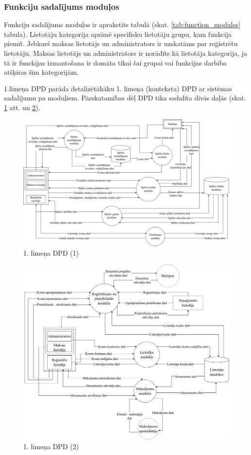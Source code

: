 \subsubsection{Funkciju sadalījums moduļos}
Funkciju sadalījums moduļos ir aprakstīts tabulā (skat. \ref{tab:function_modules} tabula).
Lietotāju kategorija apzīmē specifisku lietotāju grupu, kam funkcija piemīt.
Jebkurš maksas lietotājs un administrators ir uzskatāms par reģistrētu lietotāju.
Maksas lietotājs un administrators ir norādīts kā lietotāja kategorija, ja tā ir funckijas izmantošana ir domāta tikai šai grupai vai funkcijas darbība atšķiras šīm kategorijām.

1.līmeņa DPD parāda detalizētākāku 1. līmeņa (konteksta) DPD  ar sistēmas
sadalījumu pa moduļiem. Pārskatamības dēļ DPD tika sadalīta divās daļās (skat.
\ref{fig:dpd-1} att. un \ref{fig:dpd-2}).

\begin{figure}[htbp]
	\centering
	\includegraphics[width=\linewidth]{./src/img/1LīmeņaDPDSpēlesDatubāze.png}
    \caption{1. līmeņa DPD (1)}
	\label{fig:dpd-1}
\end{figure}

\begin{figure}[htbp]
	\centering
	\includegraphics[width=\linewidth]{./src/img/1LīmeņaDPDLietotājuDatubāze.png}
    \caption{1. līmeņa DPD (2)}
	\label{fig:dpd-2}
\end{figure}
\eject


